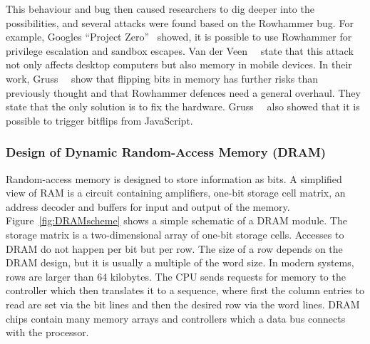 This behaviour and bug then caused researchers to dig deeper into the
possibilities, and several attacks were found based on the Rowhammer bug. For
example, Google\textquotesingle s ``Project Zero''~\cite{projectzerorow} showed,
it is possible to use Rowhammer for privilege escalation and sandbox escapes.
Van der Veen~\etal~\cite{drammer} state that this attack not only affects
desktop computers but also memory in mobile devices. In their work,
Gruss~\etal~\cite{flipinthewall} show that flipping bits in memory has further
risks than previously thought and that Rowhammer defences need a general
overhaul. They state that the only solution is to fix the hardware.
Gruss~\etal~\cite{rowhammerjs} also showed that it is possible to trigger
bitflips from JavaScript.

\subsubsection{Design of Dynamic Random-Access Memory (DRAM)}

Random-access memory is designed to store information as bits. A simplified view
of RAM is a circuit containing amplifiers, one-bit storage cell matrix, an
address decoder and buffers for input and output of the memory.
Figure~\ref{fig:DRAMscheme} shows a simple schematic of a DRAM module. The
storage matrix is a two-dimensional array of one-bit storage cells. Accesses to
DRAM do not happen per bit but per row. The size of a row depends on the DRAM
design, but it is usually a multiple of the word size. In modern systems, rows
are larger than 64 kilobytes. The CPU sends requests for memory to the
controller which then translates it to a sequence, where first the column
entries to read are set via the bit lines and then the desired row via the word
lines. DRAM chips contain many memory arrays and controllers which a data bus
connects with the processor.

